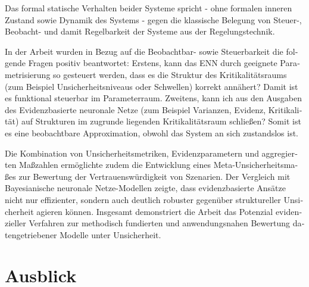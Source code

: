 \begin{otherlanguage}{ngerman}
Das formal statische Verhalten beider Systeme spricht - ohne formalen inneren Zustand sowie Dynamik des Systems - gegen die klassische Belegung von Steuer-, Beobacht- und damit Regelbarkeit der Systeme aus der Regelungstechnik.

In der Arbeit wurden in Bezug auf die Beobachtbar- sowie Steuerbarkeit die folgende Fragen positiv beantwortet: Erstens, kann das ENN durch geeignete Parametrisierung so gesteuert werden, dass es die Struktur des Kritikalitätsraums (zum Beispiel Unsicherheitsniveaus oder Schwellen) korrekt annähert? Damit ist es funktional steuerbar im Parameterraum. Zweitens, kann ich aus den Ausgaben des \gls{Evidenzbasierte neuronale Netze} (zum Beispiel Varianzen, Evidenz, Kritikalität) auf Strukturen im zugrunde liegenden Kritikalitätsraum schließen? Somit ist es eine beobachtbare Approximation, obwohl das System an sich zustandslos ist.

Die Kombination von Unsicherheitsmetriken, Evidenzparametern und aggregierten Maßzahlen ermöglichte zudem die Entwicklung eines Meta-Unsicherheitsmaßes zur Bewertung der Vertrauenswürdigkeit von Szenarien. Der Vergleich mit \gls{Bayesianische neuronale Netze}-Modellen zeigte, dass evidenzbasierte Ansätze nicht nur effizienter, sondern auch deutlich robuster gegenüber struktureller Unsicherheit agieren können. Insgesamt demonstriert die Arbeit das Potenzial evidenzieller Verfahren zur methodisch fundierten und anwendungsnahen Bewertung datengetriebener Modelle unter Unsicherheit.



\section{Ausblick}


\end{otherlanguage}
